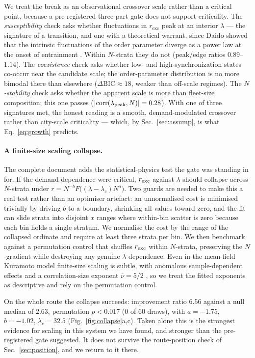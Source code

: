 \documentclass[9pt,twocolumn,twoside]{opticajnl}
\begin{document}
We treat the break as an observational crossover scale rather than a critical point, because a
pre-registered three-part gate does not support criticality. The \emph{susceptibility} check
asks whether fluctuations in $r_{\mathrm{exc}}$ peak at an interior $\lambda$ --- the signature
of a transition, and one with a theoretical warrant, since Daido showed that the intrinsic
fluctuations of the order parameter diverge as a power law at the onset of entrainment
\cite{daido90}. Within $N$-strata they do not (peak/edge ratios $0.89$--$1.14$). The
\emph{coexistence} check asks whether low- and high-synchronization states co-occur near the
candidate scale; the order-parameter distribution is no more bimodal there than elsewhere
($\Delta\mathrm{BIC} \approx 18$, weaker than off-scale regimes). The \emph{$N$-stability} check
asks whether the apparent scale is more than fleet-size composition; this one passes
($|\mathrm{corr}(\lambda_{\rm peak}, N)| = 0.28$). With one of three signatures met, the honest
reading is a smooth, demand-modulated crossover rather than city-scale criticality --- which, by
Sec.~\ref{sec:assump}, is what Eq.~\eqref{eq:growth} predicts.

\paragraph{A finite-size scaling collapse.} The complete document adds the statistical-physics
test the gate was standing in for. If the demand dependence were critical, $r_{\rm exc}$ against
$\lambda$ should collapse across $N$-strata under
$r = N^{-b}F\big((\lambda-\lambda_c)N^{a}\big)$. Two guards are needed to make this a real test
rather than an optimiser artefact: an unnormalised cost is minimised trivially by driving $b$ to
a boundary, shrinking all values toward zero, and the fit can slide strata into disjoint $x$
ranges where within-bin scatter is zero because each bin holds a single stratum. We normalise
the cost by the range of the collapsed ordinate and require at least three strata per bin. We
then benchmark against a permutation control that shuffles $r_{\rm exc}$ within $N$-strata,
preserving the $N$-gradient while destroying any genuine $\lambda$ dependence. Even in the
mean-field Kuramoto model finite-size scaling is subtle, with anomalous sample-dependent effects
and a correlation-size exponent $\bar\nu = 5/2$ \cite{hong07}, so we treat the fitted exponents
as descriptive and rely on the permutation control.

On the whole route the collapse succeeds: improvement ratio $6.56$ against a null median of
$2.63$, permutation $p < 0.017$ (0 of 60 draws), with $a = -1.75$, $b = -1.02$,
$\lambda_c = 32.5$ (Fig.~\ref{fig:collapse}a,c). Taken alone this is the strongest evidence for
scaling in this system we have found, and stronger than the pre-registered gate suggested. It
does not survive the route-position check of Sec.~\ref{sec:position}, and we return to it there.
\end{document}
